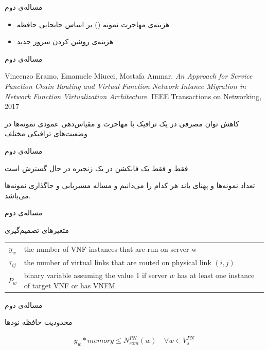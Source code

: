 \documentclass{beamer}
\begin{document}
\begin{persian}
\begin{frame}{مساله‌ی دوم}
\begin{itemize}
\begin{itemize}
			\item هزینه‌ی مهاجرت نمونه () بر اساس جابجایی حافظه
			\item هزینه‌ی روشن کردن سرور جدید
		\end{itemize}
	\end{itemize}
\end{frame}
\begin{frame}{مساله‌ی دوم}
	\begin{latin}\begin{thebibliography}{9}
		Vincenzo Eramo, Emanuele Miucci, Mostafa Ammar.
		\textit{An Approach for Service Function Chain Routing and Virtual Function Network Intance Migration in Network Function Virtualization Architecture}. 
		IEEE Transactions on Networking, 2017
	\end{thebibliography}\end{latin}
	\par
	کاهش توان مصرفی در یک ترافیک 
	با مهاجرت و مقیاس‌دهی عمودی نمونه‌ها در وضعیت‌های ترافیکی مختلف
\end{frame}
\begin{frame}{مساله‌ی دوم}
	\par
	فقط و فقط یک فانکشن در یک زنجیره در حال گسترش است.
	\par
	تعداد نمونه‌ها و پهنای باند هر کدام را می‌دانیم و مساله مسیریابی و جاگذاری نمونه‌ها می‌باشد.
\end{frame}
\begin{frame}{مساله‌ی دوم}
	\par
	متغیرهای تصمیم‌گیری
	\begin{latin}\begin{tabular}{c p{10cm}}
		$y_w$ & the number of VNF instances that are run on server w\\
		$\tau_{ij}$ & the number of virtual links that are routed on physical link $(i,j)$\\
		$P_w$ & binary variable assuming the value 1 if server $w$ has at least one instance of target VNF or has VNFM\\
	\end{tabular}\end{latin}
\end{frame}
\begin{frame}{مساله‌ی دوم}
	\par
	محدودیت حافظه نودها
	\begin{latin}\begin{align}
		y_{w} * memory \le N_{ram}^{PN}(w)
		\quad
		\forall w \in V_s^{PN}

\end{align}
\end{latin}
\end{frame}
\end{persian}
\end{document}
